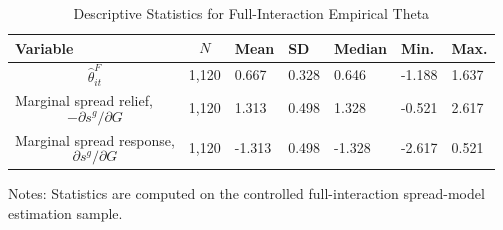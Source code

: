 \begin{table}[H]\centering
\begin{threeparttable}
\caption{Descriptive Statistics for Full-Interaction Empirical Theta}
\label{tab:theta_descriptive_stats}
\scriptsize
\begin{tabularx}{\textwidth}{lYYYYYY}
\toprule
Variable & $$N$$ & Mean & SD & Median & Min. & Max. \\
\midrule
$$\widehat{\theta}^{F}_{it}$$ & 1,120 & 0.667 & 0.328 & 0.646 & -1.188 & 1.637 \\
Marginal spread relief, $$-\partial s^g/\partial G$$ & 1,120 & 1.313 & 0.498 & 1.328 & -0.521 & 2.617 \\
Marginal spread response, $$\partial s^g/\partial G$$ & 1,120 & -1.313 & 0.498 & -1.328 & -2.617 & 0.521 \\
\bottomrule
\end{tabularx}
\begin{tablenotes}[flushleft]\footnotesize
\item Notes: Statistics are computed on the controlled full-interaction spread-model estimation sample.
\end{tablenotes}
\end{threeparttable}
\end{table}
